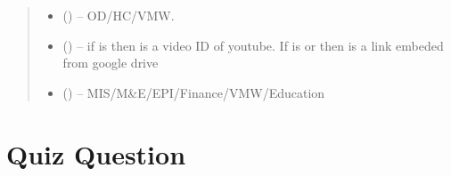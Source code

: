 \documentclass[letterpaper,10pt,english,openany,oneside]{sphinxmanual}
\begin{document}
\begin{fulllineitems}
\begin{quote}
\begin{description}
\begin{itemize}
\item {} 
\sphinxAtStartPar
{} () – OD/HC/VMW.

\item {} 
\sphinxAtStartPar
{} () – if  is  then  is a video ID of youtube. If  is  or  then  is a link embeded from google drive

\item {} 
\sphinxAtStartPar
{} () – MIS/M\&E/EPI/Finance/VMW/Education

\end{itemize}

\end{description}\end{quote}

\end{fulllineitems}



\section{Quiz Question}
\label{\detokenize{api-training/v1:quiz-question}}
\end{document}
